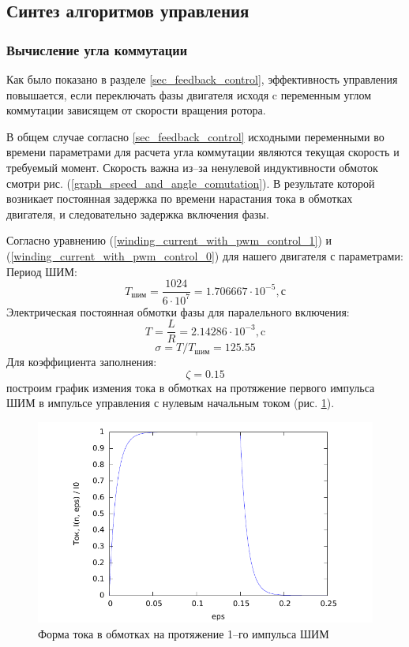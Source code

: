 \clearpage
\subsection{Синтез алгоритмов управления}
\subsubsection{Вычисление угла коммутации}
Как было показано в разделе \ref{sec_feedback_control}, эффективность управления
повышается, если переключать фазы двигателя исходя c переменным углом коммутации
зависящем от скорости вращения ротора.

В общем случае согласно \ref{sec_feedback_control} исходными переменными во
времени параметрами для расчета угла коммутации являются текущая скорость и
требуемый момент.
Скорость важна из--за ненулевой индуктивности обмоток смотри
рис. (\ref{graph_speed_and_angle_comutation}).
В результате которой возникает постоянная задержка по времени нарастания тока в
обмотках двигателя, и следовательно задержка включения фазы.

Согласно уравнению (\ref{winding_current_with_pwm_control_1}) и
    (\ref{winding_current_with_pwm_control_0})
для нашего двигателя с параметрами:
Период ШИМ:
$$
    T_\textit{шим} = \frac{1024}{6 \cdot 10^7} = 1.706667 \cdot 10^{-5}, \text{с}
$$
Электрическая постоянная обмотки фазы для паралельного включения:
$$
    T = \frac{L}{R} = 2.14286 \cdot 10^{-3}, \text{c}
$$
$$
    \sigma = T / T_\textit{шим} = 125.55
$$
Для коэффициента заполнения:
$$
    \zeta = 0.15
$$
построим график измения тока в обмотках на протяжение первого импульса ШИМ в
импульсе управления с нулевым начальным током (рис. \ref{i_step__varepsilon}).

\begin{figure}
    \centering
    \includegraphics[width=\linewidth, keepaspectratio]
                    {./src/pictures/i_step__varepsilon.pdf}
    \caption{Форма тока в обмотках на протяжение 1--го импульса ШИМ}
    \label{i_step__varepsilon}
\end{figure}

